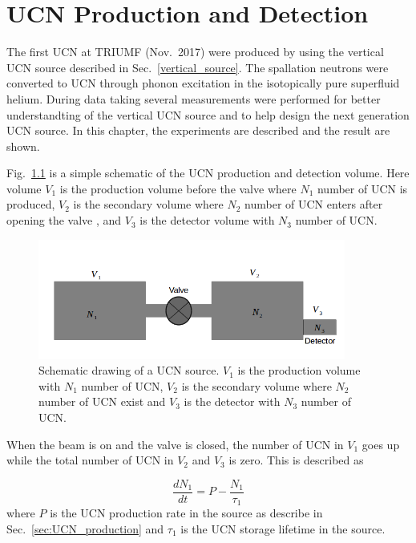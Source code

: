 \chapter{UCN Production and Detection\label{chap:UCNresult}}

The first UCN at TRIUMF (Nov.~2017) were produced by using the
vertical UCN source described in Sec.~\ref{vertical_source}. The
spallation neutrons were converted to UCN through phonon excitation in
the isotopically pure superfluid helium.  During data taking several
measurements were performed for better understandting of the vertical
UCN source and to help design the next generation UCN source. In this
chapter, the experiments are described and the result are shown.

Fig.~\ref{fig:volume_schematic} is a simple schematic of the UCN
production and detection volume.  Here volume $V_1$ is the production
volume before the valve where $N_1$ number of UCN is produced, $V_2$
is the secondary volume where $N_2$ number of UCN enters after opening
the valve , and $V_3$ is the detector volume with $N_3$ number of UCN.



\begin{figure}[h]
  \centering
  \includegraphics[width=0.9\textwidth]{volume_schematic.png}
  \caption{Schematic drawing of a UCN source. $V_1$ is the production
    volume with $N_1$ number of UCN, $V_2$ is the secondary volume
    where $N_2$ number of UCN exist and $V_3$ is the detector with
    $N_3$ number of UCN. }
  \label{fig:volume_schematic}
\end{figure}


When the beam is on and the valve is closed, the number of UCN in
$V_1$ goes up while the total number of UCN in $V_2$ and $V_3$ is
zero. This is described as 

\begin{equation}
  \label{eqn:dndt}
\frac{dN_1}{dt} = P - \frac{N_1}{\tau_1}  
\end{equation}
where $P$ is the UCN production rate in the source as describe in
Sec.~\ref{sec:UCN_production} and $\tau_1$ is the UCN storage lifetime
in the source.

